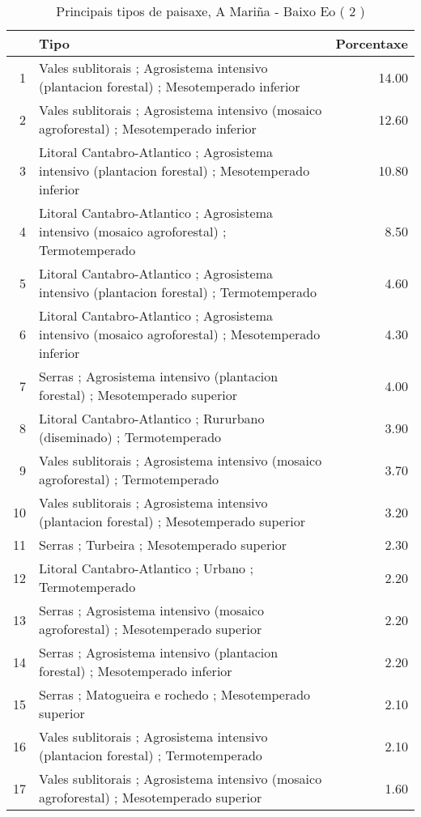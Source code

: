 \begin{table}[p]
\centering
\caption{Principais tipos de paisaxe,  A Mariña - Baixo Eo ( 2 )} 
\label{Tipos 2}
\begin{tabular}{rlr}
  \hline
 & Tipo & Porcentaxe \\ 
  \hline
1 & Vales sublitorais ; Agrosistema intensivo (plantacion forestal) ; Mesotemperado inferior & 14.00 \\ 
  2 & Vales sublitorais ; Agrosistema intensivo (mosaico agroforestal) ; Mesotemperado inferior & 12.60 \\ 
  3 & Litoral Cantabro-Atlantico ; Agrosistema intensivo (plantacion forestal) ; Mesotemperado inferior & 10.80 \\ 
  4 & Litoral Cantabro-Atlantico ; Agrosistema intensivo (mosaico agroforestal) ; Termotemperado & 8.50 \\ 
  5 & Litoral Cantabro-Atlantico ; Agrosistema intensivo (plantacion forestal) ; Termotemperado & 4.60 \\ 
  6 & Litoral Cantabro-Atlantico ; Agrosistema intensivo (mosaico agroforestal) ; Mesotemperado inferior & 4.30 \\ 
  7 & Serras ; Agrosistema intensivo (plantacion forestal) ; Mesotemperado superior & 4.00 \\ 
  8 & Litoral Cantabro-Atlantico ; Rururbano (diseminado) ; Termotemperado & 3.90 \\ 
  9 & Vales sublitorais ; Agrosistema intensivo (mosaico agroforestal) ; Termotemperado & 3.70 \\ 
  10 & Vales sublitorais ; Agrosistema intensivo (plantacion forestal) ; Mesotemperado superior & 3.20 \\ 
  11 & Serras ; Turbeira ; Mesotemperado superior & 2.30 \\ 
  12 & Litoral Cantabro-Atlantico ; Urbano ; Termotemperado & 2.20 \\ 
  13 & Serras ; Agrosistema intensivo (mosaico agroforestal) ; Mesotemperado superior & 2.20 \\ 
  14 & Serras ; Agrosistema intensivo (plantacion forestal) ; Mesotemperado inferior & 2.20 \\ 
  15 & Serras ; Matogueira e rochedo ; Mesotemperado superior & 2.10 \\ 
  16 & Vales sublitorais ; Agrosistema intensivo (plantacion forestal) ; Termotemperado & 2.10 \\ 
  17 & Vales sublitorais ; Agrosistema intensivo (mosaico agroforestal) ; Mesotemperado superior & 1.60 \\ 

\end{tabular}
\end{table}
